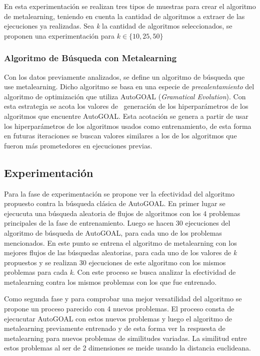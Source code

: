 En esta experimentación se realizan tres tipos de muestras para crear el
algoritmo de metalearning, teniendo en cuenta la cantidad de algoritmos a
extraer de las ejecuciones ya realizadas. Sea \emph{k} la cantidad de
algoritmos seleccionados, se proponen una experimentación para
$k \in \lbrace 10, 25, 50 \rbrace$

\subsubsection{Algoritmo de Búsqueda con Metalearning}

Con los datos previamente analizados, se define un algoritmo de búsqueda que
use metalearning. Dicho algoritmo se basa en una especie de
\emph{precalentamiento} del algoritmo de optimización que utiliza AutoGOAL
(\emph{Gramatical Evolution}). Con esta estrategia se acota los valores de~
generación de los hiperparámetros de los algoritmos que encuentre AutoGOAL.
Esta acotación se genera a partir de usar los hiperparámetros de los algoritmos
usados como entrenamiento, de esta forma en futuras iteraciones se buscan
valores similares a los de los algoritmos que fueron más prometedores en
ejecuciones previas.  

\subsection{Experimentación}

Para la fase de experimentación se propone ver la efectividad del algoritmo
propuesto contra la búsqueda clásica de AutoGOAL. En primer lugar se ejecucuta
una búsqueda aleatoria de flujos de algoritmos con los 4 problemas principales
de la fase de entrenamiento. Luego se hacen 30 ejecuciones del algoritmo de
búsqueda de AutoGOAL, para cada uno de los problemas mencionados. En este punto
se entrena el algoritmo de metalearning con los mejores flujos de las búsquedas
aleatorias, para cada uno de los valores de \emph{k} propuestos y se
realizan 30 ejecuciones de este algoritmo con los mismos problemas para cada
\emph{k}. Con este proceso se busca analizar la efectividad de metalearning
contra los mismos problemas con los que fue entrenado.

Como segunda fase y para comprobar una mejor versatilidad del algoritmo se
propone un proceso parecido con 4 nuevos problemas. El proceso consta de
ejecucutar AutoGOAL con estos nuevos problemas y luego el algoritmo de
metalearning previamente entrenado y de esta forma ver la respuesta de
metalearning para nuevos problemas de similitudes variadas. La similitud entre
estos problemas al ser de 2 dimensiones se meide usando la distancia euclideana.

